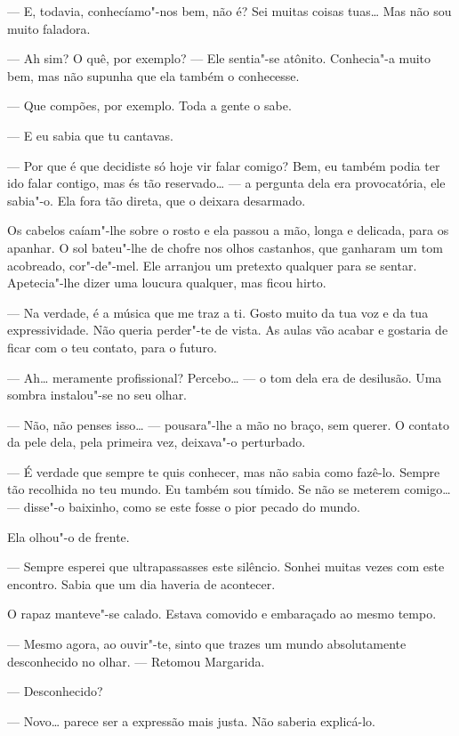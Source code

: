 --- E, todavia, conhecíamo"-nos bem, não é? Sei muitas coisas tuas\ldots{} Mas
não sou muito faladora.

--- Ah sim? O quê, por exemplo? --- Ele sentia"-se atônito. Conhecia"-a muito
bem, mas não supunha que ela também o conhecesse.

--- Que compões, por exemplo. Toda a gente o sabe.

--- E eu sabia que tu cantavas.

--- Por que é que decidiste só hoje vir falar comigo? Bem, eu também podia
ter ido falar contigo, mas és tão reservado\ldots{} --- a pergunta dela
era provocatória, ele sabia"-o. Ela fora tão direta, que o deixara
desarmado.

Os cabelos caíam"-lhe sobre o rosto e ela passou a mão, longa e delicada,
para os apanhar. O sol bateu"-lhe de chofre nos olhos castanhos, que
ganharam um tom acobreado, cor"-de"-mel. Ele arranjou um pretexto qualquer
para se sentar. Apetecia"-lhe dizer uma loucura qualquer, mas ficou
hirto.

--- Na verdade, é a música que me traz a ti. Gosto muito da tua voz e da
tua expressividade. Não queria perder"-te de vista. As aulas vão acabar e
gostaria de ficar com o teu contato, para o futuro.

--- Ah\ldots{} meramente profissional? Percebo\ldots{} --- o tom dela era de desilusão.
Uma sombra instalou"-se no seu olhar.

--- Não, não penses isso\ldots{} --- pousara"-lhe a mão no braço, sem querer. O
contato da pele dela, pela primeira vez, deixava"-o perturbado.

--- É verdade que sempre te quis conhecer, mas não sabia como fazê-lo.
Sempre tão recolhida no teu mundo. Eu também sou tímido. Se não se
meterem comigo\ldots{} --- disse"-o baixinho, como se este fosse o pior pecado
do mundo.

Ela olhou"-o de frente.

--- Sempre esperei que ultrapassasses este silêncio. Sonhei muitas vezes
com este encontro. Sabia que um dia haveria de acontecer.

O rapaz manteve"-se calado. Estava comovido e embaraçado ao mesmo tempo.

--- Mesmo agora, ao ouvir"-te, sinto que trazes um mundo absolutamente
desconhecido no olhar. ---  Retomou Margarida.

--- Desconhecido?

--- Novo\ldots{} parece ser a expressão mais justa. Não saberia explicá-lo.


